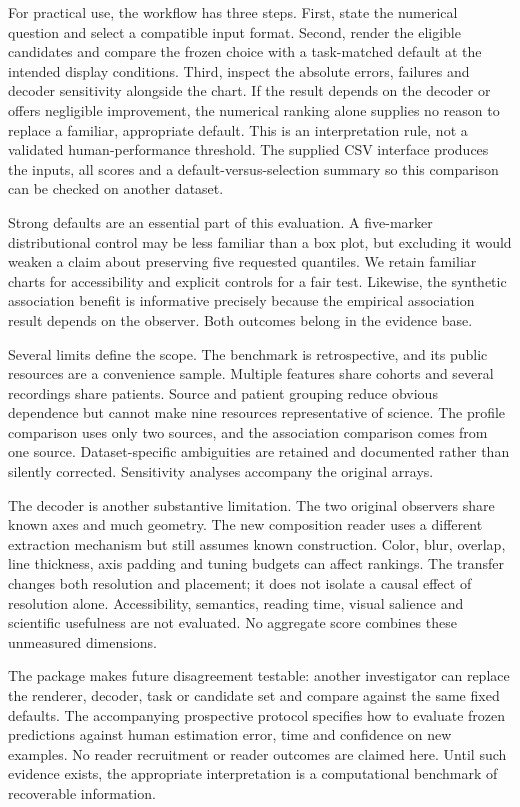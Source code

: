\documentclass[11pt]{article}
\begin{document}
For practical use, the workflow has three steps. First, state the numerical question and select a compatible input format. Second, render the eligible candidates and compare the frozen choice with a task-matched default at the intended display conditions. Third, inspect the absolute errors, failures and decoder sensitivity alongside the chart. If the result depends on the decoder or offers negligible improvement, the numerical ranking alone supplies no reason to replace a familiar, appropriate default. This is an interpretation rule, not a validated human-performance threshold. The supplied CSV interface produces the inputs, all scores and a default-versus-selection summary so this comparison can be checked on another dataset.

Strong defaults are an essential part of this evaluation. A five-marker distributional control may be less familiar than a box plot, but excluding it would weaken a claim about preserving five requested quantiles. We retain familiar charts for accessibility and explicit controls for a fair test. Likewise, the synthetic association benefit is informative precisely because the empirical association result depends on the observer. Both outcomes belong in the evidence base.

Several limits define the scope. The benchmark is retrospective, and its public resources are a convenience sample. Multiple features share cohorts and several recordings share patients. Source and patient grouping reduce obvious dependence but cannot make nine resources representative of science. The profile comparison uses only two sources, and the association comparison comes from one source. Dataset-specific ambiguities are retained and documented rather than silently corrected. Sensitivity analyses accompany the original arrays.

The decoder is another substantive limitation. The two original observers share known axes and much geometry. The new composition reader uses a different extraction mechanism but still assumes known construction. Color, blur, overlap, line thickness, axis padding and tuning budgets can affect rankings. The transfer changes both resolution and placement; it does not isolate a causal effect of resolution alone. Accessibility, semantics, reading time, visual salience and scientific usefulness are not evaluated. No aggregate score combines these unmeasured dimensions.

The package makes future disagreement testable: another investigator can replace the renderer, decoder, task or candidate set and compare against the same fixed defaults. The accompanying prospective protocol specifies how to evaluate frozen predictions against human estimation error, time and confidence on new examples. No reader recruitment or reader outcomes are claimed here. Until such evidence exists, the appropriate interpretation is a computational benchmark of recoverable information.
\end{document}
